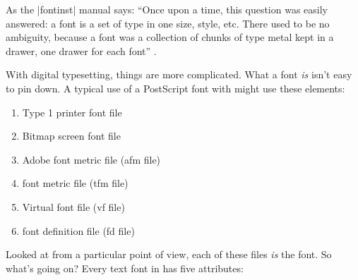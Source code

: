 As the |fontinst| manual says: ``Once upon a time, this question was easily answered: a font is a set of type
in one size, style, etc. There used to be no ambiguity, because a font was a
collection of chunks of type metal kept in a drawer, one drawer for each font'' \citet{fontinst}.


With digital typesetting, things are more complicated. What a font
\textit{is} isn't easy to pin down. A typical use of a PostScript font with \latex might
use these elements:

\begin{enumerate}
\item Type 1 printer font file
\item Bitmap screen font file
\item Adobe font metric file (afm file)
\item \tex font metric file (tfm file)
\item Virtual font file (vf file)
\item font definition file (fd file)
\end{enumerate}

Looked at from a particular point of view, each of these files \textit{is} the font. So
what’s going on? Every text font in \latex has five attributes:


